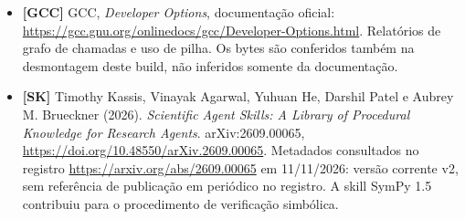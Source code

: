 \documentclass[
  brazilian,
  11pt,
  a4paper,
]{article}
\begin{document}
\begin{itemize}
  \url{https://numpy.org/doc/2.1/reference/generated/numpy.ufunc.at.html}.
  Acumulação sem buffering nos índices repetidos. Consultada em
  11/11/2026.
\item
  \textbf{{[}GCC{]}} GCC, \emph{Developer Options}, documentação
  oficial:
  \url{https://gcc.gnu.org/onlinedocs/gcc/Developer-Options.html}.
  Relatórios de grafo de chamadas e uso de pilha. Os bytes são
  conferidos também na desmontagem deste build, não inferidos somente da
  documentação.
\item
  \textbf{{[}SK{]}} Timothy Kassis, Vinayak Agarwal, Yuhuan He, Darshil
  Patel e Aubrey M. Brueckner (2026). \emph{Scientific Agent Skills: A
  Library of Procedural Knowledge for Research Agents}.
  arXiv:2609.00065, \url{https://doi.org/10.48550/arXiv.2609.00065}.
  Metadados consultados no registro
  \url{https://arxiv.org/abs/2609.00065} em 11/11/2026: versão corrente
  v2, sem referência de publicação em periódico no registro. A skill
  SymPy 1.5 contribuiu para o procedimento de verificação simbólica.
\end{itemize}
\end{document}
